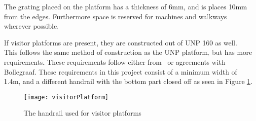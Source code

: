 \begin{UNPPlatform}
The grating placed on the platform has a thickness of 6mm, and is places 10mm from the edges. Furthermore space is reserved for machines and walkways wherever possible. \\
\end{UNPPlatform} \begin{visitorsPlatform}
If visitor platforms are present, they are constructed out of UNP 160 as well. This follows the same method of construction as the UNP platform, but has more requirements. These requirements follow either from \norm\ or agreements with Bollegraaf. These requirements in this project consist of a minimum width of 1.4m, and a different handrail with the bottom part closed off as seen in Figure \ref{fig:visitorPlatform}.

\begin{figure}[H]
\centering
\texttt{[image: visitorPlatform]}
\caption{The handrail used for visitor platforms}\label{fig:visitorPlatform}
\end{figure}

\end{visitorsPlatform}
